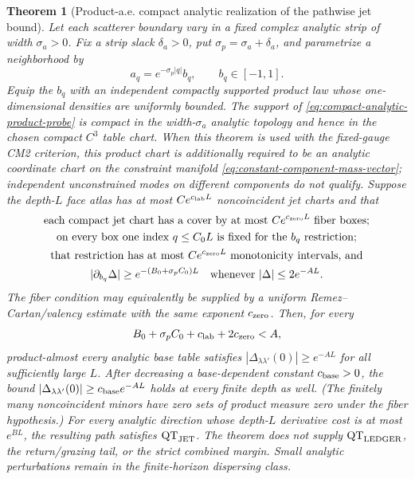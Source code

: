 \documentclass[11pt]{article}
\newtheorem{theorem}{Theorem}[section]
\begin{document}
\begin{theorem}[Product-a.e. compact analytic realization of the pathwise jet bound]
\label{thm:analytic-QT-realization}
Let each scatterer boundary vary in a fixed complex analytic strip of width
$\sigma_a>0$.  Fix a strip slack $\delta_a>0$, put
$\sigma_p=\sigma_a+\delta_a$, and parametrize a neighborhood by
\begin{equation}
\label{eq:compact-analytic-product-probe}
 a_q=e^{-\sigma_p|q|}b_q,\qquad b_q\in[-1,1].
\end{equation}
Equip the $b_q$ with an independent compactly supported product law whose
one-dimensional densities are uniformly bounded.  The support of
\eqref{eq:compact-analytic-product-probe} is compact in the width-$\sigma_a$
analytic topology and hence in the chosen compact $C^3$ table chart.  When
this theorem is used with the fixed-gauge CM2 criterion, this product chart
is additionally required to be an analytic coordinate chart on the
constraint manifold \eqref{eq:constant-component-mass-vector}; independent
unconstrained modes on different components do not qualify.  Suppose
the depth-$L$ face atlas has at most $Ce^{c_{\rm lab}L}$ noncoincident jet
charts and that
\begin{equation}
\label{eq:localized-analytic-jet-direction}
 \begin{gathered}
 \text{each compact jet chart has a cover by at most }
 Ce^{c_{\rm zero}L}\text{ fiber boxes;}\\
 \text{on every box one index }q\le C_0L\text{ is fixed for the }b_q
 \text{ restriction;}\\
 \text{that restriction has at most }Ce^{c_{\rm zero}L}
 \text{ monotonicity intervals, and}\\
 |\partial_{b_q}\Delta|\ge
 e^{-(B_0+\sigma_pC_0)L}
 \quad\text{whenever }|\Delta|\le2e^{-AL}.
 \end{gathered}
\end{equation}
The fiber condition may equivalently be supplied by a uniform
Remez--Cartan/valency estimate with the same exponent $c_{\rm zero}$.  Then,
for every
\begin{equation}
\label{eq:analytic-QT-window}
 B_0+\sigma_pC_0+c_{\rm lab}+2c_{\rm zero}
 <A,
\end{equation}
product-almost every analytic base table satisfies
$|\Delta_{\lambda\lambda'}(0)|\ge e^{-AL}$ for all sufficiently large $L$.
After decreasing a base-dependent constant $c_{\rm base}>0$, the bound
$|\Delta_{\lambda\lambda'}(0)|\ge c_{\rm base}e^{-AL}$ holds at every
finite depth as well.  (The finitely many noncoincident minors have zero sets
of product measure zero under the fiber hypothesis.)
For every analytic direction whose depth-$L$ derivative cost is at most
$e^{BL}$, the resulting path satisfies $\mathrm{QT}_{\rm JET}$.  The theorem
does not supply $\mathrm{QT}_{\rm LEDGER}$, the return/grazing tail, or the
strict combined margin.  Small
analytic perturbations remain in the finite-horizon dispersing class.


\end{theorem}
\end{document}
